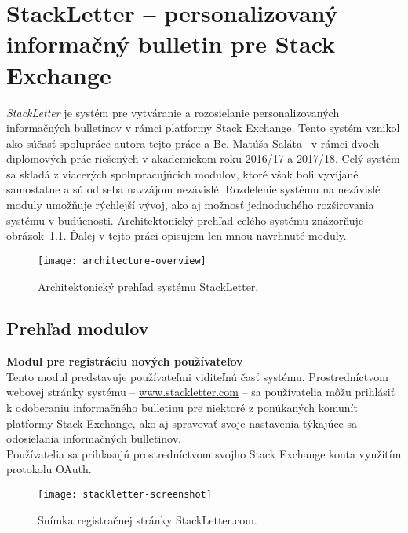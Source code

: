 \newpage
\chapter{StackLetter -- personalizovaný informačný bulletin pre Stack Exchange}

\textit{StackLetter} je systém pre vytváranie a rozosielanie personalizovaných informačných bulletinov v rámci platformy
Stack Exchange. Tento systém vznikol ako súčasť spolupráce autora tejto práce a Bc. Matúša Saláta~\cite{Salat2018} v rámci
dvoch diplomových prác riešených v akademickom roku 2016/17 a 2017/18. Celý systém sa skladá
z viacerých spolupracujúcich modulov, ktoré však boli vyvíjané samostatne a sú od seba navzájom nezávislé. Rozdelenie
systému na nezávislé moduly umožňuje rýchlejší vývoj, ako aj možnosť jednoduchého rozširovania systému v budúcnosti.
Architektonický prehľad celého systému znázorňuje obrázok~\ref{fig:architecutre-overview}. Ďalej v tejto práci opisujem
len mnou navrhnuté moduly.

\begin{figure}[H]\begin{center}
\texttt{[image: architecture-overview]}
\caption{Architektonický prehľad systému StackLetter. \label{fig:architecutre-overview}}\end{center}
\end{figure}

\section{Prehľad modulov}

\textbf{Modul pre registráciu nových používateľov}\\
Tento modul predstavuje používateľmi viditeľnú časť systému. Prostredníctvom webovej stránky systému
-- \url{www.stackletter.com} -- sa používatelia môžu prihlásiť k odoberaniu informačného bulletinu pre niektoré
z ponúkaných komunít platformy Stack Exchange, ako aj spravovať svoje nastavenia týkajúce sa odosielania informačných
bulletinov.\\
Používatelia sa prihlasujú prostredníctvom svojho Stack Exchange konta využitím protokolu OAuth.

\begin{figure}[H]\begin{center}
\texttt{[image: stackletter-screenshot]}
\caption{Snímka registračnej stránky StackLetter.com. \label{fig:stackletter.com}}\end{center}
\end{figure}

